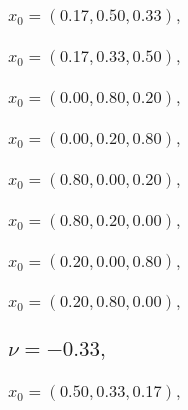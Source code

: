 \documentclass[a4paper]{article}
\begin{document}
\begin{multicols*}{2}
   \subsubsection{\(x_0 = (0.17,0.50,0.33),\quad \)}
   

   \subsubsection{\(x_0 = (0.17,0.33,0.50),\quad \)}
   

   \subsubsection{\(x_0 = (0.00,0.80,0.20),\quad \)}
   

   \subsubsection{\(x_0 = (0.00,0.20,0.80),\quad \)}
   

   \subsubsection{\(x_0 = (0.80,0.00,0.20),\quad \)}
   

   \subsubsection{\(x_0 = (0.80,0.20,0.00),\quad \)}
   

   \subsubsection{\(x_0 = (0.20,0.00,0.80),\quad \)}
   

   \subsubsection{\(x_0 = (0.20,0.80,0.00),\quad \)}
   

   \subsection{\(\nu = -0.33,\quad \)}
   

   \subsubsection{\(x_0 = (0.50,0.33,0.17),\quad \)}
   


\end{multicols*}
\end{document}
